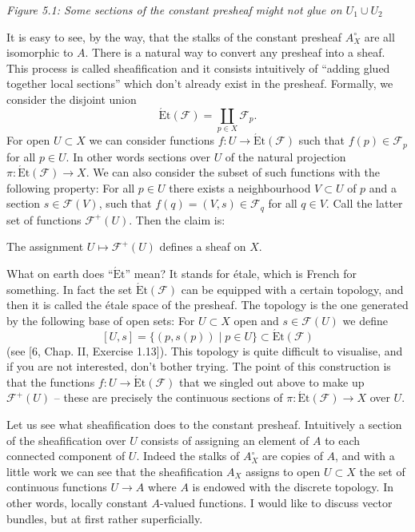 \medskip\noindent
{\it Figure 5.1: Some sections of the constant presheaf might not glue on $U_1\cup U_2$}


It is easy to see, by the way, that the stalks of the constant presheaf $A^\circ_X$ are all isomorphic
to $A$.
There is a natural way to convert any presheaf into a sheaf. This process is called sheafification
and it consists intuitively of “adding glued together local sections” which don't already
exist in the presheaf. Formally, we consider the disjoint union
\[
\operatorname{\acute Et}(\mathcal F)=\coprod_{p\in X}\mathcal F_p.
\]
For open $U\subset X$ we can consider functions $f:U\to\operatorname{\acute Et}(\mathcal F)$ such that
$f(p)\in\mathcal F_p$ for all $p\in U$. In other words sections over $U$ of the natural projection
$\pi:\operatorname{\acute Et}(\mathcal F)\to X$. We can also consider the subset of such functions
with the following property: For all $p\in U$ there exists a neighbourhood $V\subset U$ of $p$
and a section $s\in\mathcal F(V)$, such that $f(q)=(V,s)\in\mathcal F_q$ for all $q\in V$.
Call the latter set of functions $\mathcal F^+(U)$. Then the claim is:

\begin{proposition}
The assignment $U\mapsto\mathcal F^+(U)$ defines a sheaf on $X$.
\end{proposition}

\begin{remark}
What on earth does “$\operatorname{\acute Et}$” mean? It stands for étale, which is French for
something. In fact the set $\operatorname{\acute Et}(\mathcal F)$ can be equipped with a certain topology, and then it is
called the étale space of the presheaf. The topology is the one generated by the following
base of open sets: For $U\subset X$ open and $s\in\mathcal F(U)$ we define
\[
[U,s]=\{(p,s(p))\mid p\in U\}\subset\operatorname{\acute Et}(\mathcal F)
\]
(see [6, Chap. II, Exercise 1.13]). This topology is quite difficult to visualise, and if you
are not interested, don't bother trying. The point of this construction is that the functions
$f:U\to\operatorname{\acute Et}(\mathcal F)$ that we singled out above to make up $\mathcal F^+(U)$ -- these are precisely the
continuous sections of $\pi:\operatorname{\acute Et}(\mathcal F)\to X$ over $U$.
\end{remark}

Let us see what sheafification does to the constant presheaf. Intuitively a section of the
sheafification over $U$ consists of assigning an element of $A$ to each connected component
of $U$. Indeed the stalks of $A^\circ_X$ are copies of $A$, and with a little work we can see that the
sheafification $A_X$ assigns to open $U\subset X$ the set of continuous functions $U\to A$ where $A$ is
endowed with the discrete topology. In other words, locally constant $A$-valued functions.
I would like to discuss vector bundles, but at first rather superficially.

